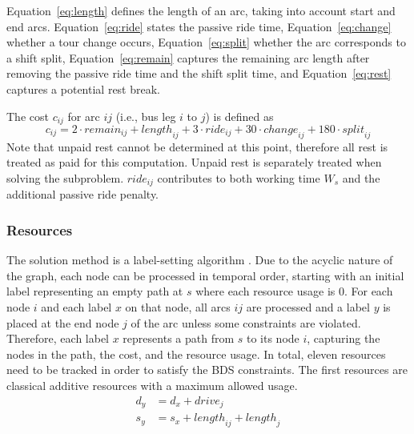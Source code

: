 \documentclass[]{amsart}
\theoremstyle{plain}
\begin{document}
\noindent
Equation~\eqref{eq:length} defines the length of an arc, taking into account start and end arcs. Equation~\eqref{eq:ride} states the passive ride time, Equation~\eqref{eq:change} whether a tour change occurs, Equation~\eqref{eq:split} whether the arc corresponds to a shift split, Equation~\eqref{eq:remain} captures the remaining arc length after removing the passive ride time and the shift split time, and Equation~\eqref{eq:rest} captures a potential rest break.

The cost $c_{ij}$ for arc $ij$ (i.e., bus leg $i$ to $j$) is defined as
\begin{equation}
    \label{eq:arc_cost}
    c_{ij}=2\cdot\mathit{remain}_{ij}+\mathit{length}_{ij}+3\cdot\mathit{ride}_{ij}+30\cdot\mathit{change}_{ij}+180\cdot\mathit{split}_{ij}
\end{equation}
\noindent
Note that unpaid rest cannot be determined at this point, therefore all rest is treated as paid for this computation. Unpaid rest is separately treated when solving the subproblem. $\mathit{ride}_{ij}$ contributes to both working time $W_s$ and the additional passive ride penalty.

\subsubsection{Resources}

The solution method is a label-setting algorithm \cite{irnich2005shortest}. Due to the acyclic nature of the graph, each node can be processed in temporal order, starting with an initial label representing an empty path at $s$ where each resource usage is 0. For each node $i$ and each label $x$ on that node, all arcs $ij$ are processed and a label $y$ is placed at the end node $j$ of the arc unless some constraints are violated. Therefore, each label $x$ represents a path from $s$ to its node $i$, capturing the nodes in the path, the cost, and the resource usage. In total, eleven resources need to be tracked in order to satisfy the BDS constraints. The first resources are classical additive resources with a maximum allowed usage.
\begin{align}
    \label{eq:dy}
    d_y &= d_x+\mathit{drive}_j\\
    \label{eq:sy}
    s_y &= s_x+\mathit{length}_{ij}+\mathit{length}_j
\end{align}
\end{document}
